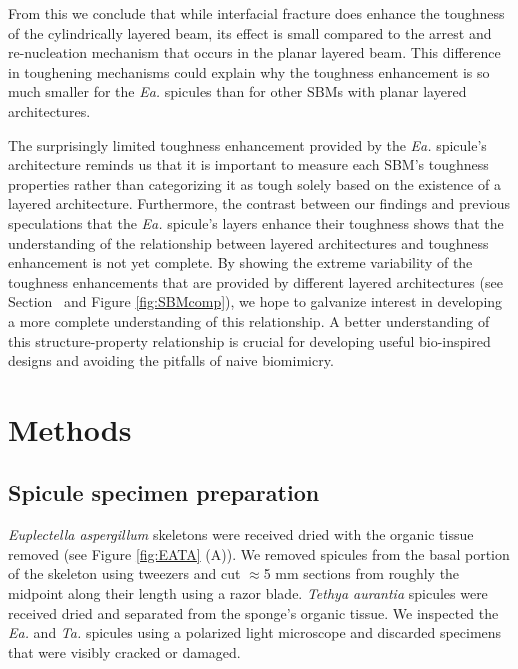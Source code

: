 \documentclass[12pt,onecolumn]{article}
\makeatletter
\DeclareRobustCommand*{\nameref}[1]{%
      \emph{\myorg@nameref{#1}}%
    }%
\newcommand{\TA}{\textit{Ta.\@}\xspace}
\newcommand{\EA}{\textit{Ea.\@}\xspace}
\makeatother
\begin{document}
\begin{bibunit}
From this we conclude that while interfacial fracture does enhance the toughness of the cylindrically layered beam, its effect is small compared to the arrest and re-nucleation mechanism that occurs in the planar layered beam. This difference in toughening mechanisms could explain why the toughness enhancement is so much smaller for the \EA spicules than for other SBMs with planar layered architectures.
	
The surprisingly limited toughness enhancement provided by the \EA spicule's architecture reminds us that it is important to measure each SBM's toughness properties rather than categorizing it as tough solely based on the existence of a layered architecture. Furthermore, the contrast between our findings and previous speculations that the \EA spicule's layers enhance their toughness shows that the understanding of the relationship between layered architectures and toughness enhancement is not yet complete. By showing the extreme variability of the toughness enhancements that are provided by different layered architectures (see Section~\nameref{sec:Rcomp} and Figure \ref{fig:SBMcomp}), we hope to galvanize interest in developing a more complete understanding of this relationship. A better understanding of this structure-property relationship is crucial for developing useful bio-inspired designs and avoiding the pitfalls of naive biomimicry. 


\section*{Methods}
\label{sec:methods}

\subsection*{Spicule specimen preparation}
\label{sec:sampleprep}
\textit{Euplectella aspergillum} skeletons were received dried with the organic tissue removed (see Figure \ref{fig:EATA} (A)). We removed spicules from the basal portion of the skeleton using tweezers and cut $\approx$5 mm sections from roughly the midpoint along their length using a razor blade. \textit{Tethya aurantia} spicules were received dried and separated from the sponge's organic tissue. We inspected the \EA and \TA spicules using a polarized light microscope and discarded specimens that were visibly cracked or damaged. 


\end{bibunit}
\end{document}
